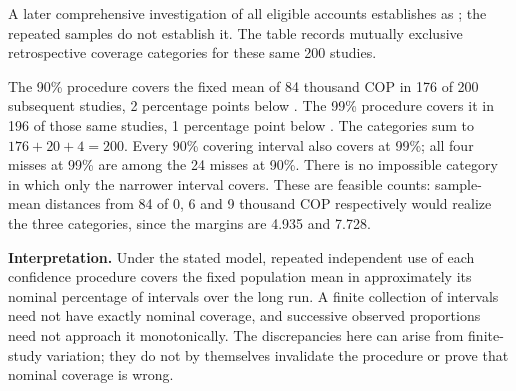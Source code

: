 \begin{probleminfoexcerpt}
A later comprehensive investigation of all eligible accounts establishes    as   ; the repeated samples do not establish it. The table records mutually exclusive retrospective coverage categories for these same 200 studies.
\end{probleminfoexcerpt}




The 90\% procedure covers the fixed mean of 84 thousand COP in 176 of 200 subsequent studies, 2 percentage points below . The 99\% procedure covers it in 196 of those same studies, 1 percentage point below . The categories sum to $176+20+4=200$. Every 90\% covering interval also covers at 99\%; all four misses at 99\% are among the 24 misses at 90\%. There is no impossible category in which only the narrower interval covers. These are feasible counts: sample-mean distances from 84 of 0, 6 and 9 thousand COP respectively would realize the three categories, since the margins are 4.935 and 7.728.

\textbf{Interpretation.} Under the stated model, repeated independent use of each confidence procedure covers the fixed population mean in approximately its nominal percentage of intervals over the long run. A finite collection of intervals need not have exactly nominal coverage, and successive observed proportions need not approach it monotonically. The discrepancies here can arise from finite-study variation; they do not by themselves invalidate the procedure or prove that nominal coverage is wrong.

